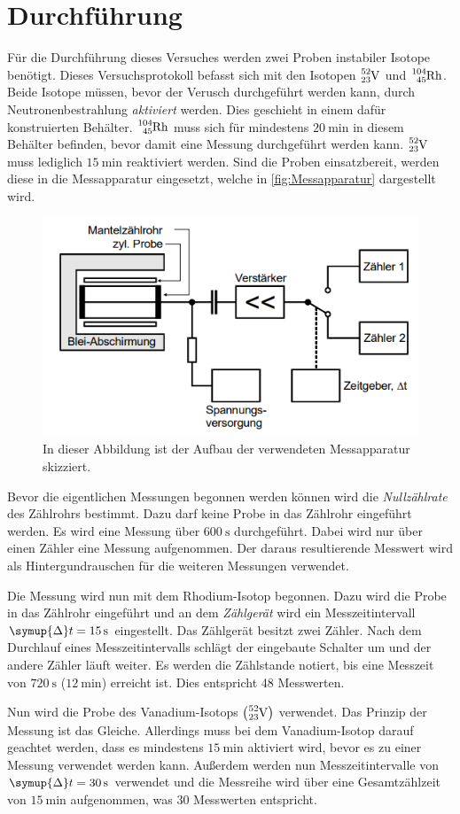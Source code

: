 \section{Durchführung}
\label{sec:Durchführung}
Für die Durchführung dieses Versuches werden zwei Proben instabiler Isotope benötigt. Dieses Versuchsprotokoll befasst sich mit den Isotopen $\ce{^{52}_{23}V}$ und 
$\ce{^{104}_{45}Rh}$. Beide Isotope müssen, bevor der Verusch durchgeführt werden kann, durch Neutronenbestrahlung \textit{aktiviert} werden. Dies geschieht in einem dafür
konstruierten Behälter. $\ce{^{104}_{45}Rh}$ muss sich für mindestens $\qty{20}{\minute}$ in diesem Behälter befinden, bevor damit eine Messung durchgeführt werden kann. 
$\ce{^{52}_{23}V}$ muss lediglich $\qty{15}{\minute}$ reaktiviert werden. Sind die Proben einsatzbereit, werden diese in die Messapparatur eingesetzt, welche in
\autoref{fig:Messapparatur} dargestellt wird.  

\begin{figure}
    \centering
    \includegraphics[width = .7\textwidth]{content/Skizzeapparatur.png}
    \caption{In dieser Abbildung ist der Aufbau der verwendeten Messapparatur skizziert. \cite{v702}}
    \label{fig:Messapparatur}
\end{figure}

Bevor die eigentlichen Messungen begonnen werden können wird die \textit{Nullzählrate} des Zählrohrs bestimmt. Dazu darf keine Probe in das Zählrohr eingeführt werden. Es wird eine Messung 
über $\qty{600}{\second}$ durchgeführt. Dabei wird nur über einen Zähler eine Messung aufgenommen. Der daraus resultierende Messwert wird als Hintergundrauschen für die weiteren
Messungen verwendet.

Die Messung wird nun mit dem Rhodium-Isotop begonnen. Dazu wird die Probe in das Zählrohr eingeführt und an dem \textit{Zählgerät} wird ein Messzeitintervall 
$\symup{\Delta}t = \qty{15}{\second}$ eingestellt. Das Zählgerät besitzt zwei Zähler. Nach dem Durchlauf eines Messzeitintervalls schlägt der eingebaute Schalter um und der 
andere Zähler läuft weiter. Es werden die Zählstande notiert, bis eine Messzeit von $\qty{720}{\second}$ ($\qty{12}{\minute}$) erreicht ist. Dies entspricht 48 Messwerten. 

Nun wird die Probe des Vanadium-Isotops $\left(\ce{^{52}_{23}V}\right)$ verwendet. Das Prinzip der Messung ist das Gleiche. Allerdings muss bei dem Vanadium-Isotop
darauf geachtet werden, dass es mindestens $\qty{15}{\minute}$ aktiviert wird, bevor es zu einer Messung verwendet werden kann. Außerdem werden nun Messzeitintervalle von 
$\symup{\Delta}t = \qty{30}{\second}$ verwendet und die Messreihe wird über eine Gesamtzählzeit von $\qty{15}{\minute}$ aufgenommen, was 30 Messwerten entspricht.
